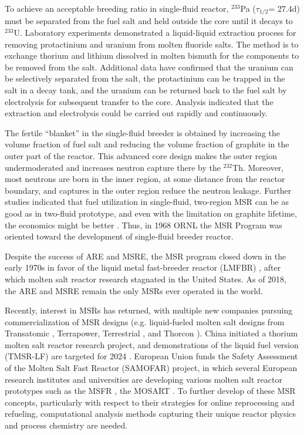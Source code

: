 To achieve an acceptable breeding ratio in single-fluid reactor, $^{233}$Pa ($\tau_{1/2}$= 27.4d) must be separated from the fuel salt and held outside the core until it decays to $^{233}$U. Laboratory experiments demonstrated a liquid-liquid extraction process for removing protactinium and uranium from molten fluoride salts. The method is to exchange thorium and lithium dissolved in molten bismuth for the components to be removed from the salt. Additional data have confirmed that the uranium can be selectively separated from the salt, the protactinium can be trapped in the salt in a decay tank, and the uranium can be returned back to the fuel salt by electrolysis for subsequent transfer to the core. Analysis indicated that the extraction and electrolysis could be carried out rapidly and continuously.

The fertile ``blanket'' in the single-fluid breeder is obtained by increasing the volume fraction of fuel salt and reducing the volume fraction of graphite in the outer part of the reactor. This advanced core design makes the outer region undermoderated and increases neutron capture there by the $^{232}$Th. Moreover, most neutrons are born in the inner region, at some distance from the reactor boundary, and captures in the outer region reduce the neutron leakage. Further studies indicated that fuel utilization in single-fluid, two-region \gls{MSR} can be as good as in two-fluid prototype, and even with the limitation on graphite lifetime, the economics might be better \cite{rosenthal_molten-salt_1970}. Thus, in 1968 \gls{ORNL} the \gls{MSR} Program was oriented toward the development of single-fluid breeder reactor.

Despite the success of \gls{ARE} and \gls{MSRE}, the \gls{MSR} program closed down in the early 1970s in favor of the liquid metal fast-breeder reactor (LMFBR) \cite{macpherson_molten_1985}, after which molten salt reactor research stagnated in the United States. As of 2018, the \gls{ARE} and \gls{MSRE} remain the only \glspl{MSR} ever operated in the world.

Recently, interest in \glspl{MSR} has returned, with multiple new companies pursuing commercialization of \gls{MSR} designs (e.g. liquid-fueled molten salt designs from Transatomic \cite{transatomic_power_corporation_technical_2016}, Terrapower, Terrestrial \cite{leblanc_18_2017}, and Thorcon \cite{jorgensen_19_2017}). China initiated a thorium molten salt reactor research project, and demonstrations of the liquid fuel version (TMSR-LF) are targeted for 2024 \cite{dai_17_2017}. European Union funds the Safety Assessment of the Molten Salt Fast Reactor (SAMOFAR) project, in which several European research institutes and universities are developing various molten salt reactor prototypes such as the \gls{MSFR} \cite{fiorina_molten_2013}, the \gls{MOSART} \cite{ignatiev_molten_2014}.
To further develop of these \gls{MSR} concepts, particularly with respect to their strategies for online reprocessing and refueling, computational analysis methods capturing their unique reactor physics and process chemistry are needed.

